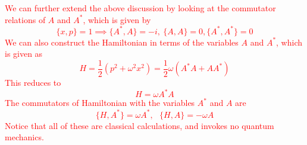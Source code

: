 \documentclass[11pt, notitlepage]{report}
\newcommand{\w}{\omega}
\numberwithin{equation}{section}
\begin{document}
        \textcolor{red}{
            We can further extend the above discussion by looking at the commutator relations of \(A\) and \(A^*\), which is given by 
            \begin{equation*}
                \{x,p\} = 1 \implies \{A^*, A\} = -i, ~\{A, A\}=0,\{A^*, A^*\} = 0 
            \end{equation*}
            We can also construct the Hamiltonian in terms of the variables \(A\) and \(A^*\), which is given as 
        \begin{equation*}
            H = \frac{1}{2}(p^2 + \w^2x^2) = \frac{1}{2}\w(A^*A+ AA^*) \tag{\(\star\)}
            \label{eq:ham_in_class}
        \end{equation*}
        This reduces to 
        \begin{equation*}
            H = \w A^* A
        \end{equation*}
        The commutators of Hamiltonian with the variables \(A^*\) and \(A\) are 
        \begin{equation*}
            \{H, A^*\} = \w A^*,~~~\{H, A\} = -\w A 
        \end{equation*}
        Notice that all of these are classical calculations, and invokes no quantum mechanics. 
        }
    
    \newpage
\end{document}
